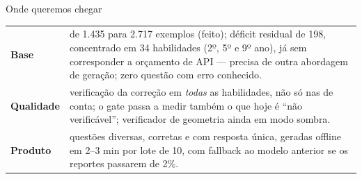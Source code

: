 \documentclass[aspectratio=169,11pt]{beamer}
\begin{document}
\begin{frame}{Onde queremos chegar}
  \centering

  \vspace{4pt}
  \footnotesize
  \begin{tabularx}{0.96\textwidth}{@{}lX@{}}
    \toprule
    \textbf{Base} & de 1.435 para 2.717 exemplos (feito); déficit residual de 198, concentrado em 34 habilidades (2º, 5º e 9º ano), já sem corresponder a orçamento de API --- precisa de outra abordagem de geração; zero questão com erro conhecido. \\
    \textbf{Qualidade} & verificação da correção em \emph{todas} as habilidades, não só nas de conta; o gate passa a medir também o que hoje é ``não verificável''; verificador de geometria ainda em modo sombra. \\
    \textbf{Produto} & questões diversas, corretas e com resposta única, geradas offline em 2--3 min por lote de 10, com fallback ao modelo anterior se os reportes passarem de 2\%. \\
    \bottomrule
  \end{tabularx}
\end{frame}
\end{document}
